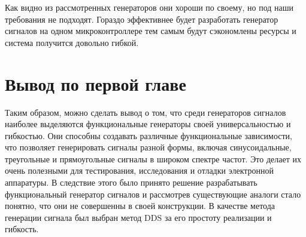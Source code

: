 	Как видно из рассмотренных генераторов они хороши по своему, но под наши требования не подходят. Гораздо эффективнее будет разработать генератор сигналов на одном микроконтроллере тем самым будут сэкономлены ресурсы и система получится довольно гибкой.
	
\section{Вывод по первой главе}
	Таким образом, можно сделать вывод о том, что среди генераторов сигналов наиболее  выделяются функциональные генераторы своей универсальностью и гибкостью. Они способны создавать различные функциональные зависимости, что позволяет генерировать сигналы разной формы, включая синусоидальные, треугольные и прямоугольные сигналы в широком спектре частот. Это делает их очень полезными для тестирования, исследования и отладки электронной аппаратуры. В следствие этого было принято решение разрабатывать функциональный генератор сигналов и рассмотрев существующие аналоги стало понятно, что они не совершенны в своей конструкции. В качестве метода генерации сигнала был выбран метод DDS за его простоту реализации и гибкость.
	
	